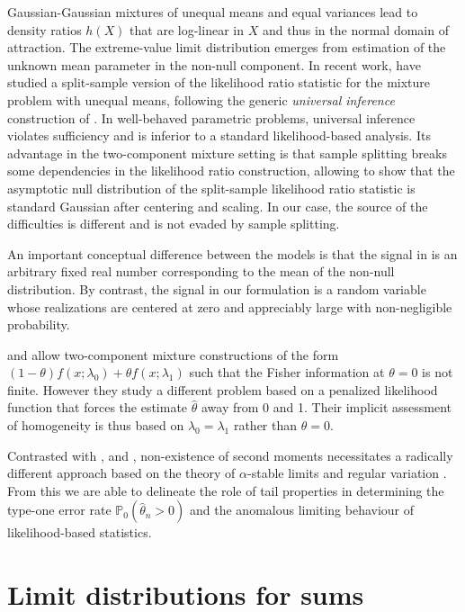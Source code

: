 \documentclass[11pt]{article}
\theoremstyle{definition}
\def\Prob{{\mathbb P}}
\begin{document}
Gaussian-Gaussian mixtures of unequal means and equal variances lead to density ratios $h(X)$ that are log-linear in $X$ and thus in the normal domain of attraction. The extreme-value limit distribution emerges from estimation of the unknown mean parameter in the non-null component. In recent work, \citet{ShiDrton} have studied a split-sample version of the likelihood ratio statistic for the mixture problem with unequal means, following the generic \emph{universal inference} construction of \citet{WRB}. In well-behaved parametric problems, universal inference violates sufficiency and is inferior to a standard likelihood-based analysis. Its advantage in the two-component mixture setting is that sample splitting breaks some dependencies in the likelihood ratio construction, allowing \citet{ShiDrton} to show that the asymptotic null distribution of the split-sample likelihood ratio statistic is standard Gaussian after centering and scaling. In our case, the source of the difficulties is different and is not evaded by sample splitting. 

An important conceptual difference between the models is that the signal in \citet{ShiDrton} is an arbitrary fixed real number corresponding to the mean of the non-null distribution. By contrast, the signal in our formulation is a random variable whose realizations are centered at zero and appreciably large with non-negligible probability. 

\citet{LiChenMarriot2009} and \citet{ChenLi2009} allow two-component mixture constructions of the form $(1-\theta)f(x;\lambda_0) + \theta f(x;\lambda_1)$ such that the Fisher information at $\theta=0$ is not finite. However they study a different problem based on a penalized likelihood function that forces the estimate $\hat\theta$ away from 0 and 1. Their implicit assessment of homogeneity is thus based on $\lambda_0=\lambda_1$ rather than $\theta=0$.

Contrasted with \citet{GS1985}, \citet{SelfLiang1987} and \citet{Bickel}, non-existence of second moments necessitates a radically different approach based on the theory of $\alpha$-stable limits \citep{GK1954} and regular variation \citep{Bingham}. From this we are able to delineate the role of tail properties in determining the type-one error rate $\Prob_0(\hat\theta_n > 0)$ and the anomalous limiting behaviour of likelihood-based statistics.

\section{Limit distributions for sums}\label{secLimitDist}
\end{document}
